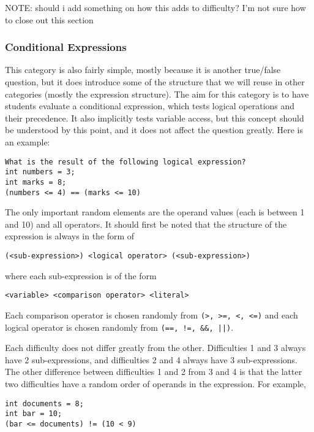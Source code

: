 \documentclass{article}
\begin{document}
NOTE: should i add something on how this adds to difficulty? I'm not sure how to close out this section

\subsubsection{Conditional Expressions} \label{subsubsec-condtional_expressions}
This category is also fairly simple, mostly because it is another true/false question, but it does introduce some of the structure that we will reuse in other
categories (mostly the expression structure). The aim for this category is to have students evaluate a conditional expression, which tests logical operations
and their precedence. It also implicitly tests variable access, but this concept should be understood by this point, and it does not affect the question greatly.
Here is an example:

\begin{lstlisting}[breaklines=true, caption={Conditional Expressions Question}, label=lst-condtionals_1]
What is the result of the following logical expression? 
int numbers = 3; 
int marks = 8; 
(numbers <= 4) == (marks <= 10) 
\end{lstlisting}


The only important random elements are the operand values (each is between 1 and 10) and all operators. It should first be noted that the structure of the expression
is always in the form of 
\begin{Verbatim}
(<sub-expression>) <logical operator> (<sub-expression>)
\end{Verbatim}
where each sub-expression is of the form 
\begin{Verbatim}
<variable> <comparison operator> <literal>
\end{Verbatim}
Each comparison operator is chosen randomly from \verb;(>, >=, <, <=); and each logical operator is chosen randomly from \verb;(==, !=, &&, ||);. 

Each difficulty does not differ greatly from the other. Difficulties 1 and 3 always have 2 sub-expressions, and difficulties 2 and 4 always have 3 sub-expressions. The other
difference between difficulties 1 and 2 from 3 and 4 is that the latter two difficulties have a random order of operands in the expression. For example,

\begin{lstlisting}
int documents = 8;
int bar = 10;
(bar <= documents) != (10 < 9)
\end{lstlisting}
\end{document}

